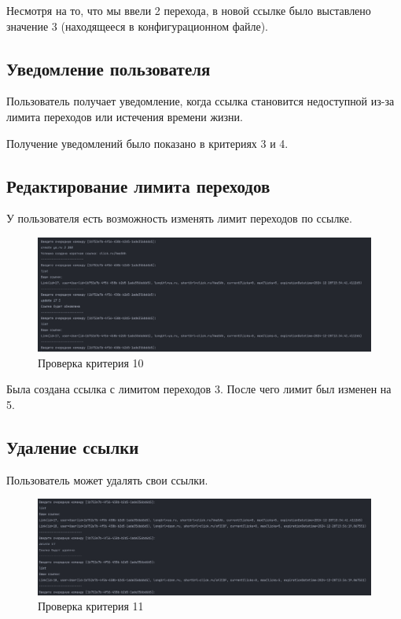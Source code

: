 \documentclass[a4paper, 14pt]{article}
\begin{document}
Несмотря на то, что мы ввели 2 перехода, в новой ссылке было выставлено значение 3 (находящееся в конфигурационном файле).

\subsection{Уведомление пользователя}

Пользователь получает уведомление, когда ссылка становится недоступной из-за лимита переходов или истечения времени жизни.

Получение уведомлений было показано в критериях 3 и 4.

\subsection{Редактирование лимита переходов}

У пользователя есть возможность изменять лимит переходов по ссылке.

\begin{figure}[H]
	\centering
	\includegraphics[width=17cm]{resources/12.png}
	\caption{Проверка критерия 10}
\end{figure}

Была создана ссылка с лимитом переходов 3. После чего лимит был изменен на 5.

\subsection{Удаление ссылки}

Пользователь может удалять свои ссылки.

\begin{figure}[H]
	\centering
	\includegraphics[width=17cm]{resources/13.png}
	\caption{Проверка критерия 11}
\end{figure}
\end{document}
